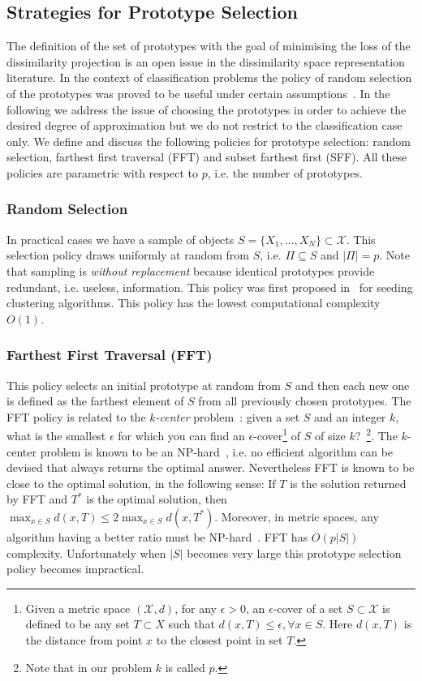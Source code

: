 \subsection{Strategies for Prototype Selection}
\label{sec:policies}
The definition of the set of prototypes with the goal of minimising
the loss of the dissimilarity projection is an open issue in the
dissimilarity space representation literature. In the context of
classification problems the policy of random selection of the
prototypes was proved to be useful under certain
assumptions~\cite{balcan2008theory}. In the following we address the
issue of choosing the prototypes in order to achieve the desired
degree of approximation but we do not restrict to the classification
case only. We define and discuss the following policies for prototype
selection: random selection, farthest first traversal (FFT) and subset
farthest first (SFF). All these policies are parametric with respect
to $p$, i.e. the number of prototypes.

\subsubsection{Random Selection}
\label{sec:random_draw_S}
In practical cases we have a sample of objects $S = \{X_1,\ldots,X_N\}
\subset \mathcal{X}$. This selection policy draws uniformly at random
from $S$, i.e. $\Pi \subseteq S$ and $|\Pi|=p$. Note that sampling is
\emph{without replacement} because identical prototypes provide
redundant, i.e. useless, information. This policy was first proposed
in~\cite{forgy1965cluster} for seeding clustering algorithms. This
policy has the lowest computational complexity $O(1)$.

\subsubsection{Farthest First Traversal (FFT)}
\label{sec:fft}
This policy selects an initial prototype at random from $S$ and then
each new one is defined as the farthest element of $S$ from all
previously chosen prototypes. The FFT policy is related to the
\emph{$k$-center} problem~\cite{hochbaum1985best}: given a set $S$ and
an integer $k$, what is the smallest $\epsilon$ for which you can find
an $\epsilon$-cover\footnote{Given a metric space $(\mathcal{X},d)$,
  for any $\epsilon > 0$, an $\epsilon$-cover of a set $S \subset
  \mathcal{X}$ is defined to be any set $T \subset X$ such that
  $d(x,T) \leq \epsilon, \forall x \in S$. Here $d(x,T)$ is the
  distance from point $x$ to the closest point in set $T$.} of $S$ of
size $k$?~\footnote{Note that in our problem $k$ is called $p$.}.
The $k$-center problem is known to be an
NP-hard~\cite{hochbaum1985best}, i.e. no efficient algorithm can be
devised that always returns the optimal answer. Nevertheless FFT is
known to be close to the optimal solution, in the following sense: If
$T$ is the solution returned by FFT and $T^*$ is the optimal solution,
then $\max_{x \in S}d(x,T) \leq 2 \max_{x \in S}d(x,T^*)$. Moreover,
in metric spaces, any algorithm having a better ratio must be
NP-hard~\cite{hochbaum1985best}. FFT has $O(p|S|)$
complexity. Unfortunately when $|S|$ becomes very large this prototype
selection policy becomes impractical.


